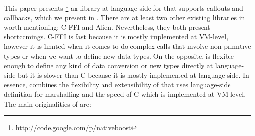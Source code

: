 


This paper presents \NBFFI\footnote{\url{http://code.google.com/p/nativeboost}} an \FFI library at language-side for \PH that supports callouts and callbacks, which we present in .
There are at least two other existing \FFI libraries in \PH worth mentioning: C-FFI and Alien.
Nevertheless, they both present shortcomings.
C-FFI is fast because it is mostly implemented at VM-level, however it is limited when it comes to do complex calls that involve non-primitive types or when we want to define new data types.
On the opposite, \Alien \FFI is flexible enough to define any kind of data conversion or new types directly at language-side but it is slower than C-\FFI because it is mostly implemented at language-side.
In essence, \NBFFI combines the flexibility and extensibility of \Alien that uses language-side definition for marshalling and the speed of C-\FFI which is implemented at VM-level.
The main originalities of \NBFFI are:

